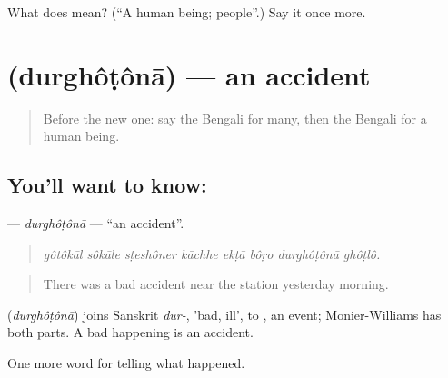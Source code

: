\begin{tcolorbox}[breakable,colback=teal!4,colframe=teal!35!black,title={Before you move on}]
What does  mean? (\textquotedblleft{}A human being; people\textquotedblright{}.) Say it once more.
\end{tcolorbox}
\section[\texorpdfstring{\bn{দুর্ঘটনা} (durghôṭônā)}{দুর্ঘটনা (durghôṭônā)}]{ (durghôṭônā) — an accident}

\label{lesson:BN-C276-durghotona}



\begin{quote}
Before the new one: say the Bengali for many, then the Bengali for a human being.
\end{quote}

\subsection*{You'll want to know: }
\textbf{} — \emph{durghôṭônā} — \textquotedblleft{}an accident\textquotedblright{}.

\begin{quote}
       
\end{quote}

\begin{quote}
\emph{gôtôkāl sôkāle sṭeshôner kāchhe ekṭā bôṛo durghôṭônā ghôṭlô.}
\end{quote}

\begin{quote}
There was a bad accident near the station yesterday morning.
\end{quote}

\begin{cousinweb}
\textbf{} (\emph{durghôṭônā}) joins Sanskrit \emph{dur-}, 'bad, ill', to \textbf{}, an event; Monier-Williams has both parts. A bad happening is an accident.
\end{cousinweb}

\begin{grammarlens}[title={What you've built}]
One more word for telling what happened.
\end{grammarlens}

